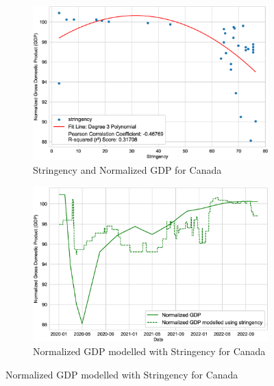 \documentclass[tikz,fleqn,12pt]{wlscirep}
\begin{document}
\begin{figure}[H]
  \begin{subfigure}[t]{0.48\textwidth}
    \centering
    \includegraphics[width=\linewidth]{images/stringency_vs_gdp_CAN.eps}
    \caption{Stringency and Normalized GDP for Canada}
  \end{subfigure}
  \label{fig:stringency_vs_gdp_CAN}
  \hfill
  \begin{subfigure}[t]{0.48\textwidth}
    \centering
    \includegraphics[width=\linewidth]{images/gdp_modelled_with_stringency_CAN.eps}
    \caption{Normalized GDP modelled with Stringency for Canada}
  \end{subfigure}
  \label{fig:gdp_modelled_with_stringency_CAN}
\end{figure}
\end{document}
